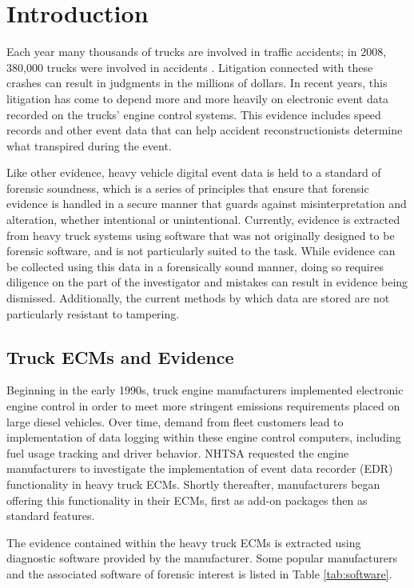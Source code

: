 \chapter{Introduction}
Each year many thousands of trucks are involved in traffic accidents; in 2008, 380,000 trucks were involved in accidents \cite{NHTSA2008}.
Litigation connected with these crashes can result in judgments in the millions of dollars. In recent years, this litigation has 
come to depend more and more heavily on electronic event data recorded on the trucks' engine control systems. 
This evidence includes speed records and other event data that can help accident reconstructionists 
determine what transpired during the event.

Like other evidence, heavy vehicle digital event data is held to a standard of forensic soundness, which is a series of principles 
that ensure that forensic evidence is handled in a secure manner that guards against misinterpretation and alteration, whether intentional
or unintentional.
Currently, evidence is extracted from heavy truck systems using software that was not originally designed to be 
forensic software, and is not particularly suited to the task. While evidence can be collected using this data in a forensically sound 
manner, doing so requires diligence on the part of the investigator and mistakes can result in evidence being dismissed. Additionally, 
the current methods by which data are stored are not particularly resistant to tampering. 

\section{Truck ECMs and Evidence}

Beginning in the early 1990s, truck engine manufacturers implemented electronic engine control in order to meet more stringent emissions
requirements placed on large diesel vehicles. Over time, demand from fleet customers lead to implementation of data logging within these
engine control computers, including fuel usage tracking and driver behavior. NHTSA requested the engine manufacturers to investigate the implementation
of event data recorder (EDR) functionality in heavy truck ECMs. Shortly thereafter, manufacturers began offering this functionality in their
ECMs, first as add-on packages then as standard features.

The evidence contained within the heavy truck ECMs is extracted using diagnostic software provided by the manufacturer. Some popular
manufacturers and the associated software of forensic interest is listed in Table \ref{tab:software}.

